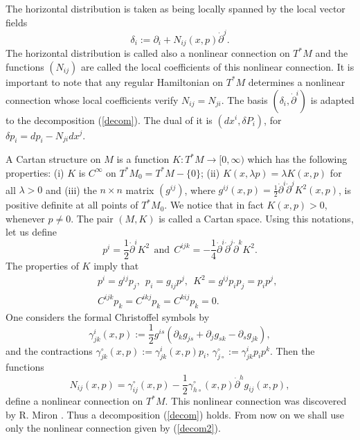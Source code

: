 \documentclass[10pt,a4paper]{article}
\theoremstyle{plain}
\theoremstyle{definition}
\begin{document}
The horizontal distribution is taken as being locally spanned by the
local vector fields
\begin{equation}
\delta_i:=\partial_i+N_{ij}(x,p)\dot{\partial}^j.\label{decom1}
\end{equation}
The horizontal distribution is called also a nonlinear
connection on $T^{\ast}M$ and the functions $(N_{ij})$ are called
the local coefficients of this nonlinear connection. It is important
to note that any regular Hamiltonian on $T^{\ast}M$ determines a
nonlinear connection whose local coefficients verify
$N_{ij}=N_{ji}$. The basis $(\delta_i,\dot{\partial}^i)$ is adapted
to the decomposition (\ref{decom}). The dual of it is $(dx^i,\delta
P_i)$, for $\delta p_i=dp_i-N_{ji}dx^j$.

A Cartan structure on $M$ is a function
$K:T^{\ast}M\longrightarrow [0,\infty)$  which has the following properties: (i) $K$ is $C^{\infty}$ on $T^{\ast}M_0=T^{\ast}M-\{0\}$; (ii) $K(x,\lambda p)=\lambda K(x,p)$ for all $\lambda>0$ and (iii) the $n\times n$ matrix $(g^{ij})$, where $g^{ij}(x,p)=\frac{1}{2}\dot{\partial}^i\dot{\partial}^jK^2(x,p)$, is positive definite at all  points of $T^{\ast}M_0$. We notice that in fact $K(x,p)>0$, whenever $p\neq0$. The pair $(M,K)$ is called a Cartan space. Using this notations, let us define
\[
p^i=\frac{1}{2}\dot{\partial}^iK^2\ \  \textrm{and}\ \ C^{ijk}=-\frac{1}{4}\dot{\partial}^i\dot{\partial}^j\dot{\partial}^kK^2.
\]
The properties of $K$ imply that
\begin{eqnarray}
&&p^i=g^{ij}p_j,\ \ p_i=g_{ij}p^j,\ \
K^2=g^{ij}p_ip_j=p_ip^j,\nonumber\\
&&C^{ijk}p_k=C^{ikj}p_k=C^{kij}p_k=0.
\end{eqnarray}
One considers the formal Christoffel symbols by
\begin{equation}
\gamma^i_{jk}(x,p):=\frac{1}{2}g^{is}(\partial_kg_{js}+\partial_jg_{sk}-\partial_sg_{jk}),
\end{equation}
and the contractions
$\gamma^{\circ}_{jk}(x,p):=\gamma^i_{jk}(x,p)p_i$,
$\gamma^{\circ}_{j\circ}:=\gamma^i_{jk}p_ip^k$. Then the functions
\begin{equation}
N_{ij}(x,p)=\gamma^{\circ}_{ij}(x,p)-\frac{1}{2}\gamma^{\circ}_{h\circ}(x,p)\dot{\partial}^hg_{ij}(x,p),\label{decom2}
\end{equation}
define a nonlinear connection on $T^{\ast}M$. This nonlinear
connection was discovered by R. Miron \cite{Mir1}. Thus a
decomposition (\ref{decom}) holds. From now on we shall use only
the nonlinear connection given by (\ref{decom2}).
\end{document}
